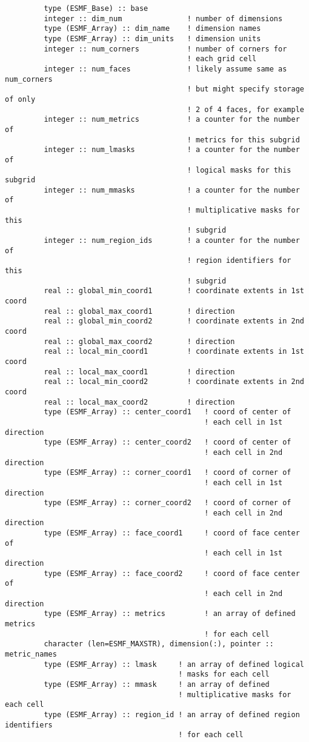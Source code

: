 \begin{verbatim}
         type (ESMF_Base) :: base
         integer :: dim_num               ! number of dimensions
         type (ESMF_Array) :: dim_name    ! dimension names
         type (ESMF_Array) :: dim_units   ! dimension units
         integer :: num_corners           ! number of corners for
                                          ! each grid cell
         integer :: num_faces             ! likely assume same as num_corners
                                          ! but might specify storage of only
                                          ! 2 of 4 faces, for example
         integer :: num_metrics           ! a counter for the number of
                                          ! metrics for this subgrid
         integer :: num_lmasks            ! a counter for the number of
                                          ! logical masks for this subgrid
         integer :: num_mmasks            ! a counter for the number of
                                          ! multiplicative masks for this
                                          ! subgrid
         integer :: num_region_ids        ! a counter for the number of
                                          ! region identifiers for this
                                          ! subgrid
         real :: global_min_coord1        ! coordinate extents in 1st coord
         real :: global_max_coord1        ! direction
         real :: global_min_coord2        ! coordinate extents in 2nd coord
         real :: global_max_coord2        ! direction
         real :: local_min_coord1         ! coordinate extents in 1st coord
         real :: local_max_coord1         ! direction
         real :: local_min_coord2         ! coordinate extents in 2nd coord
         real :: local_max_coord2         ! direction
         type (ESMF_Array) :: center_coord1   ! coord of center of
                                              ! each cell in 1st direction
         type (ESMF_Array) :: center_coord2   ! coord of center of
                                              ! each cell in 2nd direction
         type (ESMF_Array) :: corner_coord1   ! coord of corner of
                                              ! each cell in 1st direction
         type (ESMF_Array) :: corner_coord2   ! coord of corner of
                                              ! each cell in 2nd direction
         type (ESMF_Array) :: face_coord1     ! coord of face center of
                                              ! each cell in 1st direction
         type (ESMF_Array) :: face_coord2     ! coord of face center of
                                              ! each cell in 2nd direction
         type (ESMF_Array) :: metrics         ! an array of defined metrics
                                              ! for each cell
         character (len=ESMF_MAXSTR), dimension(:), pointer :: metric_names
         type (ESMF_Array) :: lmask     ! an array of defined logical
                                        ! masks for each cell
         type (ESMF_Array) :: mmask     ! an array of defined
                                        ! multiplicative masks for each cell
         type (ESMF_Array) :: region_id ! an array of defined region identifiers
                                        ! for each cell
 

\end{verbatim}
